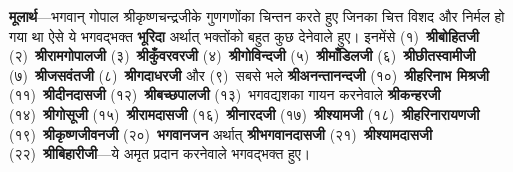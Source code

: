 \begin{sloppypar}\justifying{}
\textbf{मूलार्थ}—भगवान् गोपाल श्रीकृष्ण\-चन्द्रजीके गुणगणोंका चिन्तन करते हुए जिनका चित्त विशद और निर्मल हो गया था ऐसे ये भगवद्भक्त \textbf{भूरिदा} अर्थात् भक्तोंको बहुत कुछ देनेवाले हुए। इनमेंसे (१)~\textbf{श्रीबोहितजी} (२)~\textbf{श्रीरामगोपालजी} (३)~\textbf{श्रीकुँवरवरजी} (४)~\textbf{श्रीगोविन्दजी} (५)~\textbf{श्रीमाँडिलजी} (६)~\textbf{श्रीछीतस्वामीजी} (७)~\textbf{श्रीजसवंतजी} (८)~\textbf{श्रीगदाधरजी} और (९)~सबसे भले \textbf{श्रीअनन्तानन्दजी} (१०)~\textbf{श्रीहरिनाभ मिश्रजी} (११)~\textbf{श्रीदीनदासजी} (१२)~\textbf{श्रीबच्छपालजी} (१३)~भगवद्यशका गायन करनेवाले \textbf{श्रीकन्हरजी} (१४)~\textbf{श्रीगोसूजी} (१५)~\textbf{श्रीरामदासजी} (१६)~\textbf{श्रीनारदजी} (१७)~\textbf{श्रीश्यामजी} (१८)~\textbf{श्रीहरिनारायणजी} (१९)~\textbf{श्रीकृष्णजीवनजी} (२०)~\textbf{भगवानजन} अर्थात् \textbf{श्रीभगवानदासजी} (२१)~\textbf{श्रीश्यामदासजी} (२२)~\textbf{श्रीबिहारीजी}—ये अमृत प्रदान करनेवाले भगवद्भक्त हुए।
\end{sloppypar}



